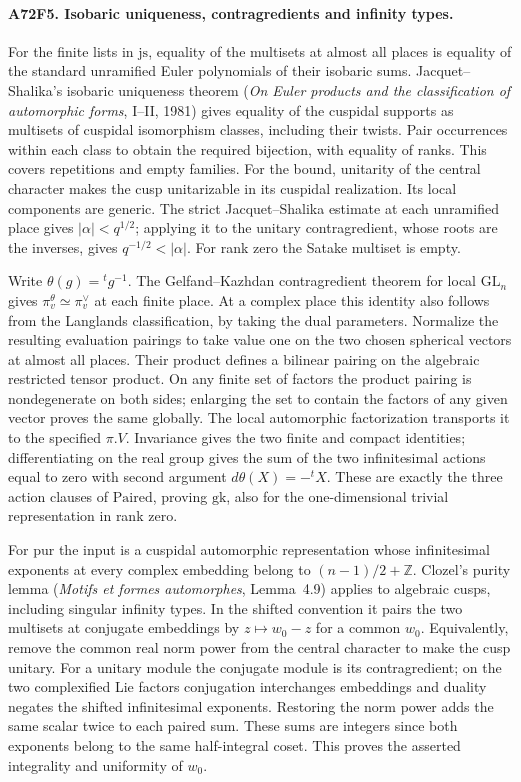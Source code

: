 \paragraph{A72F5. Isobaric uniqueness, contragredients and infinity types.}
For the finite lists in $\mathrm{js}$, equality of the multisets
at almost all places is equality of the standard unramified
Euler polynomials of their isobaric sums. Jacquet--Shalika's
isobaric uniqueness theorem (\emph{On Euler products and the
classification of automorphic forms}, I--II, 1981) gives equality
of the cuspidal supports as multisets of cuspidal isomorphism
classes, including their twists. Pair occurrences within each
class to obtain the required bijection, with equality of ranks.
This covers repetitions and empty families. For the bound,
unitarity of the central character makes the cusp unitarizable
in its cuspidal realization. Its local components are generic.
The strict Jacquet--Shalika estimate at each unramified place
gives $|\alpha|<q^{1/2}$; applying it to the unitary contragredient,
whose roots are the inverses, gives $q^{-1/2}<|\alpha|$.
For rank zero the Satake multiset is empty.

Write $\theta(g)={}^{t}g^{-1}$. The Gelfand--Kazhdan
contragredient theorem for local $\mathrm{GL}_n$ gives
$\pi_v^\theta\simeq\pi_v^\vee$ at each finite place. At a
complex place this identity also follows from the Langlands
classification, by taking the dual parameters. Normalize the
resulting evaluation pairings to take value one on the two
chosen spherical vectors at almost all places. Their product
defines a bilinear pairing on the algebraic restricted tensor
product. On any finite set of factors the product pairing is
nondegenerate on both sides; enlarging the set to contain the
factors of any given vector proves the same globally. The local
automorphic factorization transports it to the specified
$\pi.V$. Invariance gives the two finite and compact identities;
differentiating on the real group gives the sum of the two
infinitesimal actions equal to zero with second argument
$d\theta(X)=-{}^t X$. These are exactly the three action clauses
of $\mathrm{Paired}$, proving $\mathrm{gk}$, also for the
one-dimensional trivial representation in rank zero.

For $\mathrm{pur}$ the input is a cuspidal automorphic representation
whose infinitesimal exponents at every complex embedding belong
to $(n-1)/2+\mathbb Z$. Clozel's purity lemma (\emph{Motifs et
formes automorphes}, Lemma~4.9) applies to algebraic cusps,
including singular infinity types. In the shifted convention it
pairs the two multisets at conjugate embeddings by $z\mapsto w_0-z$
for a common $w_0$. Equivalently, remove the common real norm
power from the central character to make the cusp unitary.
For a unitary module the conjugate module is its contragredient;
on the two complexified Lie factors conjugation interchanges
embeddings and duality negates the shifted infinitesimal exponents.
Restoring the norm power adds the same scalar twice to each paired
sum. These sums are integers since both exponents belong to the
same half-integral coset. This proves the asserted integrality
and uniformity of $w_0$.

